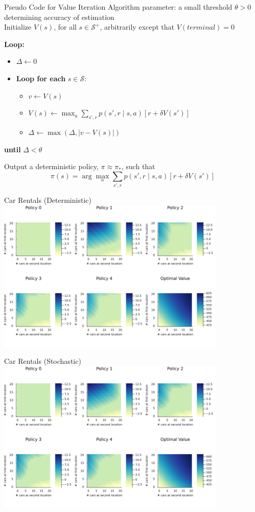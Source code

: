 \documentclass{beamer}
\begin{document}
\begin{frame}{Pseudo Code for Value Iteration}
    Algorithm parameter: a small threshold $\theta > 0$ determining accuracy of estimation \\
Initialize $V(s)$, for all $s \in \mathcal{S}^+$, arbitrarily except that $V(terminal) = 0$

\noindent \textbf{Loop:}
\begin{itemize}
    \item $\Delta \leftarrow 0$
    \item \textbf{Loop for each} $s \in \mathcal{S}$:
    \begin{itemize}
        \item $v \leftarrow V(s)$
        \item $V(s) \leftarrow \max_a \sum_{s',r} p(s',r \mid s,a) \left[ r + \delta V(s') \right]$
        \item $\Delta \leftarrow \max(\Delta, |v - V(s)|)$
    \end{itemize}
\end{itemize}
\textbf{until} $\Delta < \theta$

\noindent Output a deterministic policy, $\pi \approx \pi_*$, such that
\[
\pi(s) = \arg\max_a \sum_{s',r} p(s',r \mid s,a) \left[ r + \delta V(s') \right]
\]
\end{frame}

\begin{frame}{Car Rentals (Deterministic)}
	\includegraphics[width=11cm]{car_rental_policy_iteration_const.png}
\end{frame}

\begin{frame}{Car Rentals (Stochastic)}
	\includegraphics[width=11cm]{car_rental_policy_iteration_stoch.png}
\end{frame}
\end{document}
